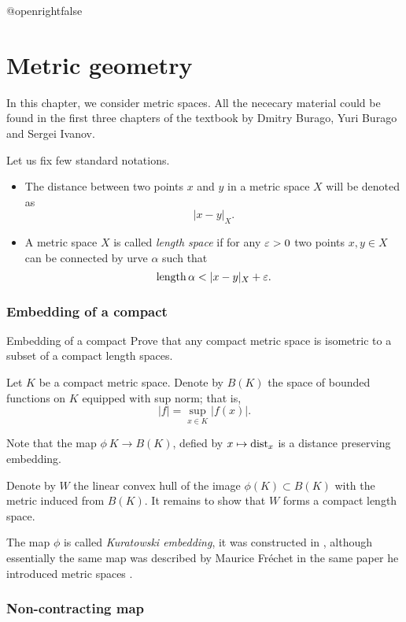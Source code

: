 \csname @openrightfalse\endcsname
\chapter{Metric geometry}

In this chapter, we consider metric spaces.
All the nececary material could be found in the first three chapters of the textbook \cite{bbi} by Dmitry Burago, Yuri  Burago and Sergei Ivanov. 

Let us fix few standard notations.
\begin{itemize}
\item The distance between two points $x$ and $y$ in a metric space $X$
will be denoted as 
\[|x-y|_X.\]
\item A metric space $X$ is called \emph{length space} if for any $\varepsilon>0$ two points $x,y\in X$ can be connected by urve $\alpha$
such that
\[\length\alpha<|x-y|_X+\eps.\]
\end{itemize}

\subsection*{Embedding of a compact}

\begin{pr}{}{Embedding of a compact}\label{compact} 
Prove that any compact metric space 
is isometric to 
a subset of a compact length spaces.
\end{pr}

Let $K$ be a compact metric space.
Denote by $B(K)$ the space of bounded functions on $K$
equipped with sup norm; 
that is, 
\[|f|=\sup_{x\in K}|f(x)|.\]

Note that the map $\phi\:K\to B(K)$, defied by $x\mapsto \operatorname{\rm dist}_x$
is a distance preserving embedding.

Denote by $W$ the linear convex hull of the image $\phi(K)\subset B(K)$ 
with the metric induced from $B(K)$.
It remains to show that $W$ forms a compact length space.
\qeds

The map $\phi$ is called \emph{Kuratowski embedding},
it was constructed in \cite{kuratowski},
although essentially the same map 
was described by Maurice Fr\'echet 
in the same paper he introduced metric spaces \cite[see][]{frechet}.


\subsection*{Non-contracting map\easy}

